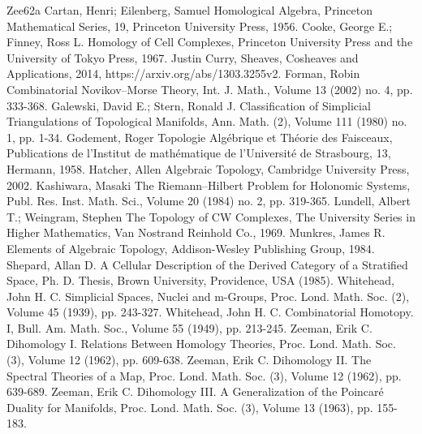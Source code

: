 \documentclass[10pt]{amsart}
\theoremstyle{definition}
\numberwithin{equation}{section}
\numberwithin{figure}{section}
\begin{document}
\begin{thebibliography}{Zee62a}
 Cartan, Henri; Eilenberg, Samuel Homological Algebra, Princeton Mathematical Series, 19, Princeton University Press, 1956.
 Cooke, George E.; Finney, Ross L. Homology of Cell Complexes, Princeton University Press and the University of Tokyo Press, 1967.
 Justin Curry, Sheaves, Cosheaves and Applications, 2014, https://arxiv.org/abs/1303.3255v2.
 Forman, Robin Combinatorial Novikov–Morse Theory, Int. J. Math., Volume 13 (2002) no. 4, pp. 333-368.
 Galewski, David E.; Stern, Ronald J. Classification of Simplicial Triangulations of Topological Manifolds, Ann. Math. (2), Volume 111 (1980) no. 1, pp. 1-34.
 Godement, Roger Topologie Algébrique et Théorie des Faisceaux, Publications de l’Institut de mathématique de l’Université de Strasbourg, 13, Hermann, 1958.
 Hatcher, Allen Algebraic Topology, Cambridge University Press, 2002.
 Kashiwara, Masaki The Riemann–Hilbert Problem for Holonomic Systems, Publ. Res. Inst. Math. Sci., Volume 20 (1984) no. 2, pp. 319-365.
 Lundell, Albert T.; Weingram, Stephen The Topology of CW Complexes, The University Series in Higher Mathematics, Van Nostrand Reinhold Co., 1969.
 Munkres, James R. Elements of Algebraic Topology, Addison-Wesley Publishing Group, 1984.
 Shepard, Allan D. A Cellular Description of the Derived Category of a Stratified Space, Ph. D. Thesis, Brown University, Providence, USA (1985).
 Whitehead, John H. C. Simplicial Spaces, Nuclei and m-Groups, Proc. Lond. Math. Soc. (2), Volume 45 (1939), pp. 243-327.
 Whitehead, John H. C. Combinatorial Homotopy. I, Bull. Am. Math. Soc., Volume 55 (1949), pp. 213-245.
 Zeeman, Erik C. Dihomology I. Relations Between Homology Theories, Proc. Lond. Math. Soc. (3), Volume 12 (1962), pp. 609-638.
 Zeeman, Erik C. Dihomology II. The Spectral Theories of a Map, Proc. Lond. Math. Soc. (3), Volume 12 (1962), pp. 639-689.
 Zeeman, Erik C. Dihomology III. A Generalization of the Poincaré Duality for Manifolds, Proc. Lond. Math. Soc. (3), Volume 13 (1963), pp. 155-183.
\end{thebibliography}
\end{document}
